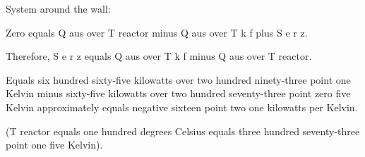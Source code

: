 System around the wall:

Zero equals Q aus over T reactor minus Q aus over T k f plus S e r z.

Therefore, S e r z equals Q aus over T k f minus Q aus over T reactor.

Equals six hundred sixty-five kilowatts over two hundred ninety-three point one Kelvin minus sixty-five kilowatts over two hundred seventy-three point zero five Kelvin approximately equals negative sixteen point two one kilowatts per Kelvin.

(T reactor equals one hundred degrees Celsius equals three hundred seventy-three point one five Kelvin).